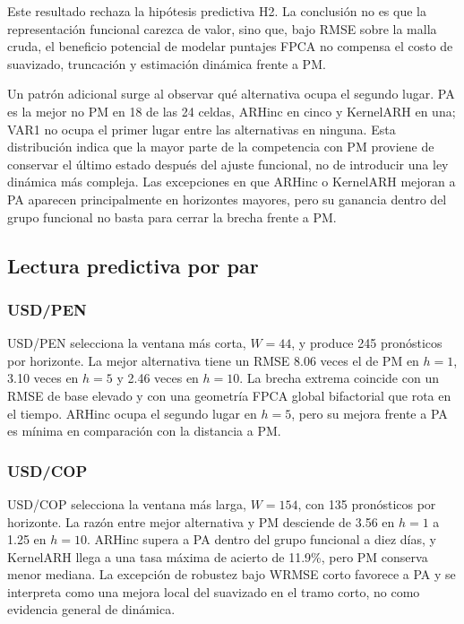 \documentclass[a4paper,11pt]{article}
\begin{document}
Este resultado rechaza la hipótesis predictiva H2. La conclusión no es que la representación funcional carezca de valor, sino que, bajo RMSE sobre la malla cruda, el beneficio potencial de modelar puntajes FPCA no compensa el costo de suavizado, truncación y estimación dinámica frente a PM.

Un patrón adicional surge al observar qué alternativa ocupa el segundo lugar. PA es la mejor no PM en 18 de las 24 celdas, ARHinc en cinco y KernelARH en una; VAR1 no ocupa el primer lugar entre las alternativas en ninguna. Esta distribución indica que la mayor parte de la competencia con PM proviene de conservar el último estado después del ajuste funcional, no de introducir una ley dinámica más compleja. Las excepciones en que ARHinc o KernelARH mejoran a PA aparecen principalmente en horizontes mayores, pero su ganancia dentro del grupo funcional no basta para cerrar la brecha frente a PM.

\subsection{Lectura predictiva por par}

\subsubsection{USD/PEN}

USD/PEN selecciona la ventana más corta, \(W=44\), y produce 245 pronósticos por horizonte. La mejor alternativa tiene un RMSE 8.06 veces el de PM en \(h=1\), 3.10 veces en \(h=5\) y 2.46 veces en \(h=10\). La brecha extrema coincide con un RMSE de base elevado y con una geometría FPCA global bifactorial que rota en el tiempo. ARHinc ocupa el segundo lugar en \(h=5\), pero su mejora frente a PA es mínima en comparación con la distancia a PM.

\subsubsection{USD/COP}

USD/COP selecciona la ventana más larga, \(W=154\), con 135 pronósticos por horizonte. La razón entre mejor alternativa y PM desciende de 3.56 en \(h=1\) a 1.25 en \(h=10\). ARHinc supera a PA dentro del grupo funcional a diez días, y KernelARH llega a una tasa máxima de acierto de 11.9\%, pero PM conserva menor mediana. La excepción de robustez bajo WRMSE corto favorece a PA y se interpreta como una mejora local del suavizado en el tramo corto, no como evidencia general de dinámica.
\end{document}
